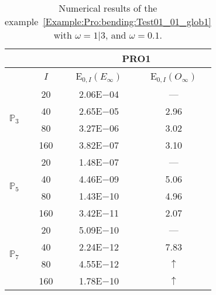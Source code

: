 \begin{table}[H]
\caption{Numerical results of the example~\ref{Example:Pro:bending:Test01_01_glob1} with $\omega=1|3$, and $\omega=0.1$.}
\setlength{\tabcolsep}{5pt}
\centering
\begin{tabular}{@{}l c c c@{}}
\toprule
 &  & \multicolumn{2}{c}{PRO1}\\
\midrule
 & $I$ & E$_{0,I}(E_{\infty})$ & E$_{0,I}(O_{\infty})$\\
\midrule
\multirow{4}{*}{$\mathbb{P}_{3}$} & 20 & 2.06E$-$04 & ---\\
 & 40 & 2.65E$-$05 & 2.96\\
 & 80 & 3.27E$-$06 & 3.02\\
 & 160 & 3.82E$-$07 & 3.10\\
\midrule
\multirow{4}{*}{$\mathbb{P}_{5}$} & 20 & 1.48E$-$07 & ---\\
 & 40 & 4.46E$-$09 & 5.06\\
 & 80 & 1.43E$-$10 & 4.96\\
 & 160 & 3.42E$-$11 & 2.07\\
\midrule
\multirow{4}{*}{$\mathbb{P}_{7}$} & 20 & 5.09E$-$10 & ---\\
 & 40 & 2.24E$-$12 & 7.83\\
 & 80 & 4.55E$-$12 & $\uparrow$\\
 & 160 & 1.78E$-$10 & $\uparrow$\\
\bottomrule
\end{tabular}
\label{Table:PRO:test_01_01_test17}
\end{table}
